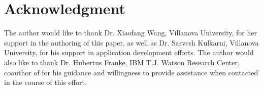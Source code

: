 
\section*{Acknowledgment}

The author would like to thank Dr. Xiaofang Wang, Villanova University, for her support in the authoring of this paper, as well as Dr. Sarvesh Kulkarni, Villanova University, for his support in application development efforts. 
The author would also like to thank Dr. Hubertus Franke, IBM T.J. Watson Research Center, coauthor of \cite{chen_enabling_2014} for his guidance and willingness to provide assistance when contacted in the course of this effort.